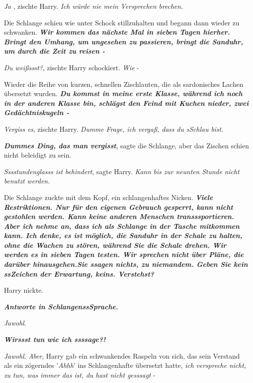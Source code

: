\emph{\glqq{}Ja\grqq{}} , zischte Harry. \emph{\glqq{}Ich würde nie mein
Versprechen brechen.\grqq{}}

Die Schlange schien wie unter Schock stillzuhalten und begann dann wieder zu
schwanken. \textbf{\emph{\glqq{}Wir kommen das nächste Mal in sieben Tagen
hierher. Bringt den Umhang, um ungesehen zu passieren, bringt die Sanduhr, um
durch die Zeit zu reisen -}}\grqq{}

\emph{\glqq{}Du weißssst?}\grqq{}, zischte Harry schockiert. \glqq{}\emph{Wie} -\grqq{}

Wieder die Reihe von kurzen, schnellen Zischlauten, die als sardonisches Lachen
übersetzt wurden. \glqq{}\textbf{\emph{Du kommst in meine erste Klasse, während
ich noch in der anderen Klasse bin, schlägst den Feind mit Kuchen nieder, zwei
Gedächtniskugeln -}}\grqq{}

\glqq{}\emph{Vergiss es}\grqq{}, zischte Harry. \glqq{}\emph{Dumme Frage, ich
vergaß, dass du sSchlau bist.}\grqq{}

\glqq{}\textbf{\emph{Dummes Ding, das man vergisst}}\grqq{}, sagte die Schlange,
aber das Zischen schien nicht beleidigt zu sein.

\glqq{}\emph{Sssstundenglasss ist behindert}\grqq{}, sagte Harry. \glqq{}
\emph{Kann bis zur neunten Stunde nicht benutzt werden.}\grqq{}

Die Schlange zuckte mit dem Kopf, ein schlangenhaftes Nicken. \glqq{}
\textbf{\emph{Viele Restriktionen. Nur für den eigenen Gebrauch gesperrt, kann
nicht gestohlen werden. Kann keine anderen Menschen transssportieren. Aber ich
nehme an, dass ich als Schlange in der Tasche mitkommen kann. Ich denke, es ist
möglich, die Sanduhr in der Schale zu halten, ohne die Wachen zu stören, während
Sie die Schale drehen. Wir werden es in sieben Tagen testen. Wir sprechen nicht
über Pläne, die darüber hinausgehen.Sie ssagen nichts, zu niemandem. Geben Sie
kein ssZeichen der Erwartung, keins. Verstehst?}}\grqq{}

Harry nickte.

\glqq{}\textbf{\emph{Antworte in SchlangenssSprache.}}\grqq{}

\glqq{}\emph{Jawohl}.\grqq{}

\glqq{}\textbf{\emph{Wirssst tun wie ich ssssage?!}}\grqq{}

\glqq{}\emph{Jawohl}. \emph{Aber}\grqq{}, Harry gab ein schwankendes Raspeln von
sich, das sein Verstand als ein zögerndes '\emph{Ahhh}' ins Schlangenhafte
übersetzt hatte, \glqq{}\emph{ich verspreche nicht, zu tun, was immer das ist, du
hast nicht gesssagt} -\grqq{}

